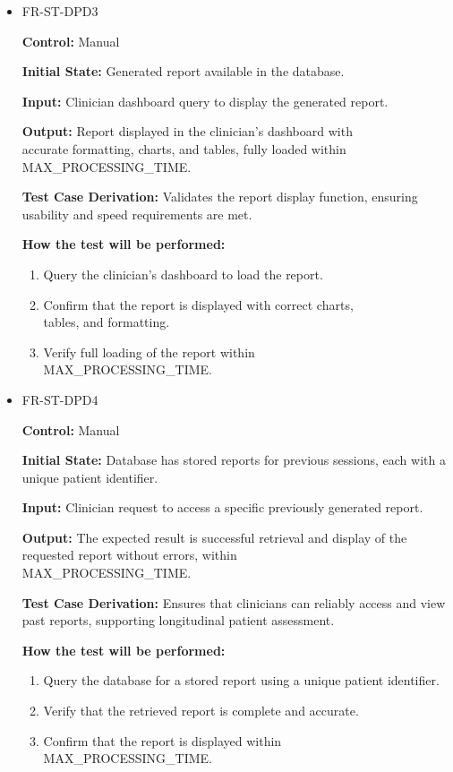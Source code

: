 \documentclass[12pt, titlepage]{article}
\begin{document}
\begin{itemize}
  \item FR-ST-DPD3
  \begin{mdframed}[linewidth=0.5mm]
      \textbf{Control:} Manual \par
      \textbf{Initial State:} Generated report available in the database. \par
      \textbf{Input:} Clinician dashboard query to display the generated report. \par
      \textbf{Output:} Report displayed in the clinician’s dashboard with \\accurate formatting, charts, and tables, fully loaded within \\MAX\_PROCESSING\_TIME. \par
      \textbf{Test Case Derivation:} Validates the report display function, ensuring usability and speed requirements are met. \par
      \textbf{How the test will be performed:}
      \begin{enumerate}[noitemsep]
        \item Query the clinician’s dashboard to load the report. 
        \item Confirm that the report is displayed with correct charts, \\tables, and formatting. 
        \item Verify full loading of the report within \\MAX\_PROCESSING\_TIME.
      \end{enumerate}
  \end{mdframed}

  \item FR-ST-DPD4
  \begin{mdframed}[linewidth=0.5mm]
      \textbf{Control:} Manual \par
      \textbf{Initial State:} Database has stored reports for previous sessions, each with a unique patient identifier. \par
      \textbf{Input:} Clinician request to access a specific previously generated report. \par
      \textbf{Output:} The expected result is successful retrieval and display of the requested report without errors, within \\MAX\_PROCESSING\_TIME. \par
      \textbf{Test Case Derivation:} Ensures that clinicians can reliably access and view past reports, supporting longitudinal patient assessment.\par
      \textbf{How the test will be performed:}
      \begin{enumerate}[noitemsep]
        \item Query the database for a stored report using a unique patient identifier. 
        \item Verify that the retrieved report is complete and accurate. 
        \item Confirm that the report is displayed within \\MAX\_PROCESSING\_TIME.
      \end{enumerate}
  \end{mdframed}

\end{itemize}
\end{document}
